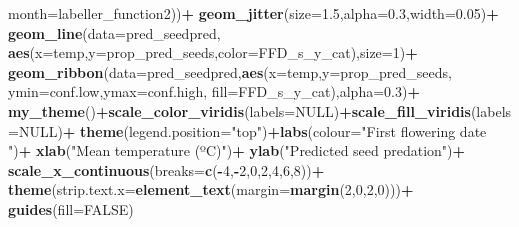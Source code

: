 \documentclass[
]{article}
\newenvironment{Shaded}{\begin{snugshade}}{\end{snugshade}}
\newcommand{\DataTypeTok}[1]{\textcolor[rgb]{0.13,0.29,0.53}{#1}}
\newcommand{\DecValTok}[1]{\textcolor[rgb]{0.00,0.00,0.81}{#1}}
\newcommand{\FloatTok}[1]{\textcolor[rgb]{0.00,0.00,0.81}{#1}}
\newcommand{\KeywordTok}[1]{\textcolor[rgb]{0.13,0.29,0.53}{\textbf{#1}}}
\newcommand{\NormalTok}[1]{#1}
\newcommand{\OperatorTok}[1]{\textcolor[rgb]{0.81,0.36,0.00}{\textbf{#1}}}
\newcommand{\OtherTok}[1]{\textcolor[rgb]{0.56,0.35,0.01}{#1}}
\newcommand{\StringTok}[1]{\textcolor[rgb]{0.31,0.60,0.02}{#1}}
\begin{document}
\begin{Shaded}
\begin{Highlighting}[]
                               \DataTypeTok{month=}\NormalTok{labeller\_function2))}\OperatorTok{+}
\StringTok{  }\KeywordTok{geom\_jitter}\NormalTok{(}\DataTypeTok{size=}\FloatTok{1.5}\NormalTok{,}\DataTypeTok{alpha=}\FloatTok{0.3}\NormalTok{,}\DataTypeTok{width=}\FloatTok{0.05}\NormalTok{)}\OperatorTok{+}
\StringTok{  }\KeywordTok{geom\_line}\NormalTok{(}\DataTypeTok{data=}\NormalTok{pred\_seedpred,}
            \KeywordTok{aes}\NormalTok{(}\DataTypeTok{x=}\NormalTok{temp,}\DataTypeTok{y=}\NormalTok{prop\_pred\_seeds,}\DataTypeTok{color=}\NormalTok{FFD\_s\_y\_cat),}\DataTypeTok{size=}\DecValTok{1}\NormalTok{)}\OperatorTok{+}
\StringTok{  }\KeywordTok{geom\_ribbon}\NormalTok{(}\DataTypeTok{data=}\NormalTok{pred\_seedpred,}\KeywordTok{aes}\NormalTok{(}\DataTypeTok{x=}\NormalTok{temp,}\DataTypeTok{y=}\NormalTok{prop\_pred\_seeds,}
                                     \DataTypeTok{ymin=}\NormalTok{conf.low,}\DataTypeTok{ymax=}\NormalTok{conf.high,}
                                     \DataTypeTok{fill=}\NormalTok{FFD\_s\_y\_cat),}\DataTypeTok{alpha=}\FloatTok{0.3}\NormalTok{)}\OperatorTok{+}
\StringTok{  }\KeywordTok{my\_theme}\NormalTok{()}\OperatorTok{+}\KeywordTok{scale\_color\_viridis}\NormalTok{(}\DataTypeTok{labels=}\OtherTok{NULL}\NormalTok{)}\OperatorTok{+}\KeywordTok{scale\_fill\_viridis}\NormalTok{(}\DataTypeTok{labels=}\OtherTok{NULL}\NormalTok{)}\OperatorTok{+}
\StringTok{  }\KeywordTok{theme}\NormalTok{(}\DataTypeTok{legend.position=}\StringTok{"top"}\NormalTok{)}\OperatorTok{+}\KeywordTok{labs}\NormalTok{(}\DataTypeTok{colour=}\StringTok{"First flowering date      "}\NormalTok{)}\OperatorTok{+}
\StringTok{  }\KeywordTok{xlab}\NormalTok{(}\StringTok{"Mean temperature (ºC)"}\NormalTok{)}\OperatorTok{+}
\StringTok{  }\KeywordTok{ylab}\NormalTok{(}\StringTok{"Predicted seed predation"}\NormalTok{)}\OperatorTok{+}
\StringTok{  }\KeywordTok{scale\_x\_continuous}\NormalTok{(}\DataTypeTok{breaks=}\KeywordTok{c}\NormalTok{(}\OperatorTok{{-}}\DecValTok{4}\NormalTok{,}\OperatorTok{{-}}\DecValTok{2}\NormalTok{,}\DecValTok{0}\NormalTok{,}\DecValTok{2}\NormalTok{,}\DecValTok{4}\NormalTok{,}\DecValTok{6}\NormalTok{,}\DecValTok{8}\NormalTok{))}\OperatorTok{+}
\StringTok{  }\KeywordTok{theme}\NormalTok{(}\DataTypeTok{strip.text.x=}\KeywordTok{element\_text}\NormalTok{(}\DataTypeTok{margin=}\KeywordTok{margin}\NormalTok{(}\DecValTok{2}\NormalTok{,}\DecValTok{0}\NormalTok{,}\DecValTok{2}\NormalTok{,}\DecValTok{0}\NormalTok{)))}\OperatorTok{+}
\StringTok{  }\KeywordTok{guides}\NormalTok{(}\DataTypeTok{fill=}\OtherTok{FALSE}\NormalTok{)}
\end{Highlighting}
\end{Shaded}
\end{document}
